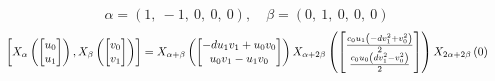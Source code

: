 \documentclass[11pt]{article}
\theoremstyle{definition}
\begin{document}
\[
\alpha = \left( 1, \  -1, \  0, \  0, \  0\right), \quad \beta = \left( 0, \  1, \  0, \  0, \  0\right)
\]
\[
\scaletoalign{\textwidth}{\left[ X_{\alpha}\left(\left[\begin{matrix}u_{0}\\u_{1}\end{matrix}\right]\right), X_{\beta}\left(\left[\begin{matrix}v_{0}\\v_{1}\end{matrix}\right]\right) \right] = X_{\alpha + \beta}\left(\left[\begin{matrix}- d u_{1} v_{1} + u_{0} v_{0}\\u_{0} v_{1} - u_{1} v_{0}\end{matrix}\right]\right) X_{\alpha + 2\beta}\left(\left[\begin{matrix}\frac{c_{0} u_{1} \left(- d v_{1}^{2} + v_{0}^{2}\right)}{2}\\\frac{c_{0} u_{0} \left(d v_{1}^{2} - v_{0}^{2}\right)}{2}\end{matrix}\right]\right) X_{2\alpha + 2\beta}\left(0\right)}
\]
\end{document}
